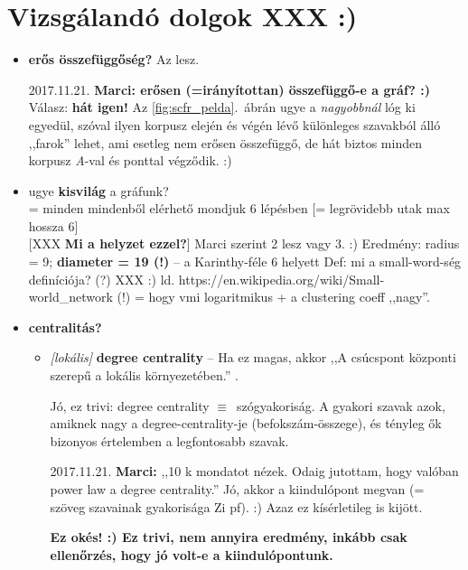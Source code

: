 \documentclass{llncs}
\newcommand{\embf}[1]{\textbf{#1}}
\newcommand{\XXX}[1]{{\small \color{megjcolor} [XXX #1]}}
\newcommand{\XXXb}[1]{\XXX{\embf{#1}}}
\newcommand{\azonos}{\ensuremath{\equiv}\ }
\begin{document}
\newpage %

\section{Vizsgálandó dolgok XXX :)}

\begin{itemize}
\setlength\itemsep{1em}

\item
\embf{erős összefüggőség?}
Az lesz.

2017.11.21. \embf{Marci: erősen (=irányítottan) összefüggő-e a gráf? :)}
Válasz: \embf{hát igen!}
Az \ref{fig:scfr_pelda}.\ ábrán ugye a \emph{nagyobbnál} lóg ki egyedül,
szóval ilyen korpusz elején és végén lévő
különleges szavakból álló ,,farok'' lehet,
ami esetleg nem erősen összefüggő,
de hát biztos minden korpusz \emph{A}-val és ponttal végződik. :)

\item
ugye \embf{kisvilág} a gráfunk?\\
= minden mindenből elérhető mondjuk 6 lépésben
[= legrövidebb utak max hossza 6]\\
\XXXb{Mi a helyzet ezzel?}
%
Marci szerint 2 lesz vagy 3. :)
%
Eredmény:
radius = 9; \embf{diameter = 19 (!)} -- a Karinthy-féle 6 helyett
%
Def: mi a small-word-ség definíciója? (?) XXX :)
ld. https://en.wikipedia.org/wiki/Small-world\_network (!)
= hogy vmi logaritmikus + a clustering coeff ,,nagy''.

\item
\embf{centralitás?}

\begin{itemize}

\item
\emph{[lokális]} \embf{degree centrality} --
Ha ez magas, akkor
,,A csúcspont központi szerepű a lokális környezetében.''
\cite{kovacs2012magyar}.

Jó, ez trivi:
degree centrality \azonos szógyakoriság.
A gyakori szavak azok, amiknek nagy
a degree-centrality-je (befokszám-összege),
és tényleg ők bizonyos értelemben a legfontosabb szavak.

2017.11.21. \embf{Marci:}
,,10 k mondatot nézek.
Odaig jutottam, hogy valóban power law a degree centrality.''
Jó, akkor a kiindulópont megvan (= szöveg szavainak gyakorisága Zi pf). :)
Azaz ez kísérletileg is kijött.

\embf{Ez okés! :) Ez trivi, nem annyira eredmény,
inkább csak ellenőrzés, hogy jó volt-e a kiindulópontunk.}


\end{itemize}
\end{itemize}
\end{document}
